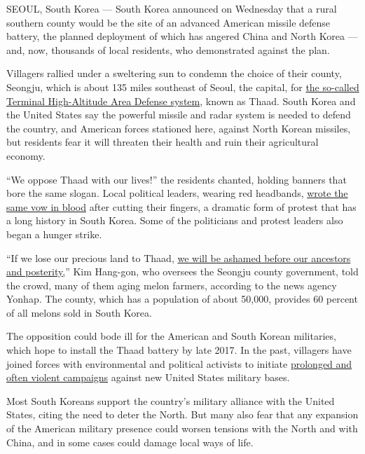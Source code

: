 SEOUL, South Korea --- South Korea announced on Wednesday that a rural
southern county would be the site of an advanced American missile
defense battery, the planned deployment of which has angered China and
North Korea --- and, now, thousands of local residents, who demonstrated
against the plan.

Villagers rallied under a sweltering sun to condemn the choice of their
county, Seongju, which is about 135 miles southeast of Seoul, the
capital, for
\href{http://www.nytimes.com/2016/07/08/world/asia/south-korea-and-us-agree-to-deploy-missile-defense-system.html}{the
so-called Terminal High-Altitude Area Defense system}, known as Thaad.
South Korea and the United States say the powerful missile and radar
system is needed to defend the country, and American forces stationed
here, against North Korean missiles, but residents fear it will threaten
their health and ruin their agricultural economy.

``We oppose Thaad with our lives!'' the residents chanted, holding
banners that bore the same slogan. Local political leaders, wearing red
headbands,
\href{http://www.yonhapnews.co.kr/society/2016/07/13/0701000000AKR20160713113900053.HTML?template=2087}{wrote
the same vow in blood} after cutting their fingers, a dramatic form of
protest that has a long history in South Korea. Some of the politicians
and protest leaders also began a hunger strike.

``If we lose our precious land to Thaad,
\href{http://www.yonhapnews.co.kr/society/2016/07/13/0701000000AKR20160713113900053.HTML?template=2087}{we
will be ashamed before our ancestors and posterity,}'' Kim Hang-gon, who
oversees the Seongju county government, told the crowd, many of them
aging melon farmers, according to the news agency Yonhap. The county,
which has a population of about 50,000, provides 60 percent of all
melons sold in South Korea.

The opposition could bode ill for the American and South Korean
militaries, which hope to install the Thaad battery by late 2017. In the
past, villagers have joined forces with environmental and political
activists to initiate
\href{http://www.nytimes.com/2006/05/04/world/asia/04iht-korea.html}{prolonged
and often violent campaigns} against new United States military bases.

Most South Koreans support the country's military alliance with the
United States, citing the need to deter the North. But many also fear
that any expansion of the American military presence could worsen
tensions with the North and with China, and in some cases could damage
local ways of life.

